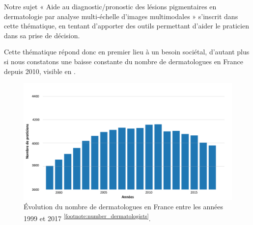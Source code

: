 Notre sujet « Aide au diagnostic/pronostic des lésions pigmentaires en dermatologie par analyse multi-échelle d’images multimodales » s’inscrit dans cette thématique, en tentant d’apporter des outils permettant d’aider le praticien dans sa prise de décision.\par

Cette thématique répond donc en premier lieu à un besoin sociétal, d’autant plus si nous constatons une baisse constante du nombre de dermatologues en France depuis 2010, visible en .
\begin{figure}[H]
    \centering
    \includegraphics[width=\linewidth]{contents/i_introduction/resources/evolution_dermatologists.pdf}
    \caption{Évolution du nombre de dermatologues en France entre les années 1999 et 2017 \textsuperscript{\ref{footnote:number_dermatologists}}.}
    \label{fig:number_dermatologists}
\end{figure}\par
\addtocounter{footnote}{1}

